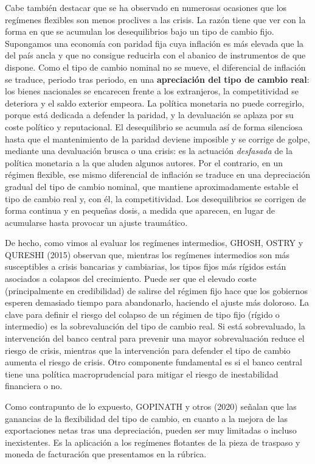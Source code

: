 \documentclass[10pt,a4paper]{article}
\begin{document}
Cabe también destacar que se ha observado en numerosas ocasiones que los regímenes flexibles son menos proclives a las crisis. La razón tiene que ver con la forma en que se acumulan los desequilibrios bajo un tipo de cambio fijo. Supongamos una economía con paridad fija cuya inflación es más elevada que la del país ancla y que no consigue reducirla con el abanico de instrumentos de que dispone. Como el tipo de cambio nominal no se mueve, el diferencial de inflación se traduce, periodo tras periodo, en una \textbf{apreciación del tipo de cambio real}: los bienes nacionales se encarecen frente a los extranjeros, la competitividad se deteriora y el saldo exterior empeora. La política monetaria no puede corregirlo, porque está dedicada a defender la paridad, y la devaluación se aplaza por su coste político y reputacional. El desequilibrio se acumula así de forma silenciosa hasta que el mantenimiento de la paridad deviene imposible y se corrige de golpe, mediante una devaluación brusca o una crisis: es la actuación \textit{desfasada} de la política monetaria a la que aluden algunos autores. Por el contrario, en un régimen flexible, ese mismo diferencial de inflación se traduce en una depreciación gradual del tipo de cambio nominal, que mantiene aproximadamente estable el tipo de cambio real y, con él, la competitividad. Los desequilibrios se corrigen de forma continua y en pequeñas dosis, a medida que aparecen, en lugar de acumularse hasta provocar un ajuste traumático.

De hecho, como vimos al evaluar los regímenes intermedios, GHOSH, OSTRY y QURESHI (2015) observan que, mientras los regímenes intermedios son más susceptibles a crisis bancarias y cambiarias, los tipos fijos más rígidos están asociados a colapsos del crecimiento. Puede ser que el elevado coste (principalmente en credibilidad) de salirse del régimen fijo hace que los gobiernos esperen demasiado tiempo para abandonarlo, haciendo el ajuste más doloroso. La clave para definir el riesgo del colapso de un régimen de tipo fijo (rígido o intermedio) es la sobrevaluación del tipo de cambio real. Si está sobrevaluado, la intervención del banco central para prevenir una mayor sobrevaluación reduce el riesgo de crisis, mientras que la intervención para defender el tipo de cambio aumenta el riesgo de crisis. Otro componente fundamental es si el banco central tiene una política macroprudencial para mitigar el riesgo de inestabilidad financiera o no.

Como contrapunto de lo expuesto, GOPINATH y otros (2020) señalan que las ganancias de la flexibilidad del tipo de cambio, en cuanto a la mejora de las exportaciones netas tras una depreciación, pueden ser muy limitadas o incluso inexistentes. Es la aplicación a los regímenes flotantes de la pieza de traspaso y moneda de facturación que presentamos en la rúbrica.
\end{document}
